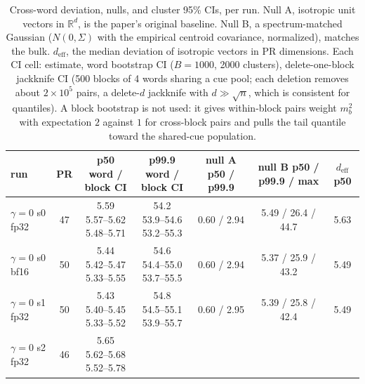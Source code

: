 \documentclass{article}
\begin{document}
\begin{table}[h]
  \centering\scriptsize
  \caption{Cross-word deviation, nulls, and cluster 95\% CIs, per run. Null A,
    isotropic unit vectors in $\mathbb{R}^d$, is the paper's original baseline. Null
    B, a spectrum-matched Gaussian ($N(0,\Sigma)$ with the empirical centroid
    covariance, normalized), matches the bulk. $d_{\mathrm{eff}}$, the median
    deviation of isotropic vectors in PR dimensions. Each CI cell: estimate, word
    bootstrap CI ($B{=}1000$, 2000 clusters), delete-one-block jackknife CI (500
    blocks of 4 words sharing a cue pool; each deletion removes about $2\times10^5$
    pairs, a delete-$d$ jackknife with $d\gg\sqrt{n}$, which is consistent for
    quantiles). A block bootstrap is not used: it gives within-block pairs weight
    $m_b^2$ with expectation $2$ against $1$ for cross-block pairs and pulls the
  tail quantile toward the shared-cue population.}
  \label{tab:nulls}
  \renewcommand{\arraystretch}{1.05}
  \setlength{\tabcolsep}{1.5pt}
  \begin{tabular}{@{}lcccccc@{}}
    \toprule
    run & PR & \makecell{p50\\word / block CI} &
    \makecell{p99.9\\word / block CI} & null A p50 / p99.9 & null B p50 / p99.9 / max &
    $d_{\mathrm{eff}}$ p50 \\
    \midrule
    $\gamma{=}0$ s0 fp32 & 47 & \makecell{5.59\\5.57--5.62\\5.48--5.71} &
    \makecell{54.2\\53.9--54.6\\53.2--55.3} & 0.60 / 2.94 & 5.49 / 26.4 / 44.7 &
    5.63 \\
    $\gamma{=}0$ s0 bf16 & 50 & \makecell{5.44\\5.42--5.47\\5.33--5.55} &
    \makecell{54.6\\54.4--55.0\\53.7--55.5} & 0.60 / 2.94 & 5.37 / 25.9 / 43.2 &
    5.49 \\
    $\gamma{=}0$ s1 fp32 & 50 & \makecell{5.43\\5.40--5.45\\5.33--5.52} &
    \makecell{54.8\\54.5--55.1\\53.9--55.7} & 0.60 / 2.95 & 5.39 / 25.8 / 42.4 &
    5.49 \\
    $\gamma{=}0$ s2 fp32 & 46 & \makecell{5.65\\5.62--5.68\\5.52--5.78} &

\end{tabular}
\end{table}
\end{document}
